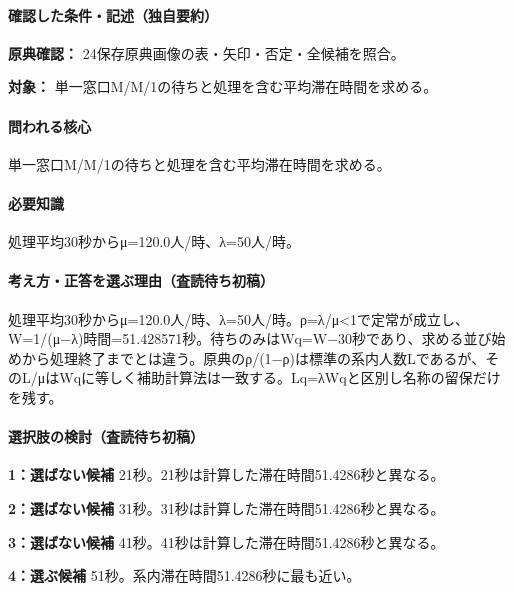 \paragraph{確認した条件・記述（独自要約）}\mbox{}\par

\noindent\textbf{原典確認：} 24保存原典画像の表・矢印・否定・全候補を照合。\par

\noindent\textbf{対象：} 単一窓口M/M/1の待ちと処理を含む平均滞在時間を求める。\par

\paragraph{問われる核心} 単一窓口M/M/1の待ちと処理を含む平均滞在時間を求める。

\paragraph{必要知識} 処理平均30秒からμ=120.0人/時、λ=50人/時。

\paragraph{考え方・正答を選ぶ理由（査読待ち初稿）} 処理平均30秒からμ=120.0人/時、λ=50人/時。ρ=λ/μ<1で定常が成立し、W=\allowbreak{}1/(μ−λ)時間=51.428571秒。待ちのみはWq=\allowbreak{}W−30秒であり、求める並び始めから処理終了までとは違う。原典のρ/(1−ρ)は標準の系内人数Lであるが、そのL/μはWqに等しく補助計算法は一致する。Lq=λWqと区別し名称の留保だけを残す。

\paragraph{選択肢の検討（査読待ち初稿）}\mbox{}\par

\noindent\textbf{1：選ばない候補} 21秒。21秒は計算した滞在時間51.4286秒と異なる。\par

\noindent\textbf{2：選ばない候補} 31秒。31秒は計算した滞在時間51.4286秒と異なる。\par

\noindent\textbf{3：選ばない候補} 41秒。41秒は計算した滞在時間51.4286秒と異なる。\par

\noindent\textbf{4：選ぶ候補} 51秒。系内滞在時間51.4286秒に最も近い。\par

